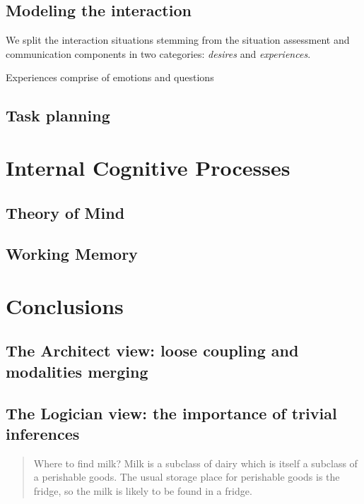 \documentclass[letterpaper, 10 pt, conference]{ieeeconf}  %
\begin{document}
\subsection{Modeling the interaction}

We split the interaction situations stemming from the situation assessment and
communication components in two categories: \emph{desires} and
\emph{experiences}.

Experiences comprise of emotions and questions
\subsection{Task planning}

\cite{Alili2008}

\section{Internal Cognitive Processes}
\label{sect|intern}

\subsection{Theory of Mind}

\cite{Warnier2012a}

\subsection{Working Memory}

\section{Conclusions}
\label{sect|conclusion}

\subsection{The Architect view: loose coupling and modalities merging}

\subsection{The Logician view: the importance of trivial inferences}

\begin{quote}

    Where to find milk? Milk is a subclass of dairy which is itself a subclass
    of a perishable goods. The usual storage place for perishable goods is the
    fridge, so the milk is likely to be found in a fridge.

\end{quote}
\end{document}
